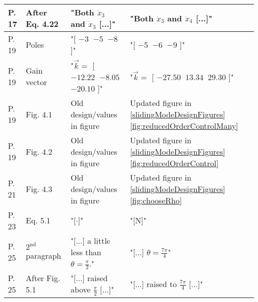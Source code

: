 \begin{table}[H]
\begin{tabular}{|lp{4cm}|p{10cm}|p{10cm}|}
    P. 17 & After Eq. 4.22      & "Both $\dot{x}_3$ and $\dot{x}_3$ [...]" & "Both $\dot{x}_3$ and $\dot{x}_4$ [...]" \\
    \hline %
    P. 19 & Poles               & "[ $-3\ $ $-5\ $ $-8$ ]"  &  "[ $-5\ $ $-6\ $ $-9$ ]"         \\
    \hline %
    P. 19 & Gain vector         & "$\vec{k} =$ [ $-12.22\ $ $-8.05\ $ $-20.10$ ]" &  "$\vec{k} =$ [ $-27.50\ $ $13.34\ $ $29.30$ ]"  \\  
    \hline %
    P. 19 & Fig. 4.1            & Old design/values in figure  & Updated figure in \autoref{slidingModeDesignFigures} \autoref{fig:reducedOrderControlMany} \\
    \hline %
    P. 19 & Fig. 4.2            & Old design/values in figure  & Updated figure in \autoref{slidingModeDesignFigures} \autoref{fig:reducedOrderControl} \\
    \hline %
    P. 21 & Fig. 4.3            & Old design/values in figure  & Updated figure in \autoref{slidingModeDesignFigures} \autoref{fig:chooseRho} \\
    \hline %
    P. 23 & Eq. 5.1             & "[$\cdot$]"      &  "[\si{N}]"                         \\
    \hline %
    P. 25 & $2^\mathrm{nd}$ paragraph & "[...] a little less than $\theta = \frac{\pi}{2}$." & "[...] $\theta = \frac{7\pi}{4}$" \\
    \hline %
    P. 25 & After Fig. 5.1      & "[...] raised above $\frac{\pi}{2}$ [...]" & "[...] raised to $\frac{7\pi}{4}$ [...]" \\
    \hline %
  \end{tabular}
\end{table}